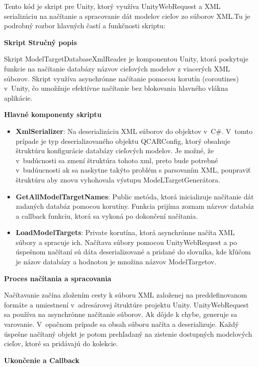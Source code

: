 Tento kód je skript pre Unity, ktorý využíva UnityWebRequest a XML serializáciu na načítanie a spracovanie dát modelov cieľov zo súborov XML.Tu je podrobný rozbor hlavných častí a funkčnosti skriptu:

{\normalsize\textbf{Skript Stručný popis}}

Skript ModelTargetDatabaseXmlReader je komponentou Unity, ktorá poskytuje funkcie na načítanie databázy názvov cieľových modelov z viacerých XML súborov. Skript využíva asynchrónne načítanie pomocou korutín (coroutines) v~Unity, čo umožňuje efektívne načítanie bez blokovania hlavného vlákna aplikácie.

{\normalsize\textbf{Hlavné komponenty skriptu}}

\begin{itemize}
    \item {\small\textbf{XmlSerializer}}: Na deserializáciu XML súborov do objektov v~C\#. V~tomto prípade je typ deserializovaného objektu QCARConfig, ktorý obsahuje štruktúru konfigurácie databázy cieľových modelov. Je možné, že v~budúcnosti sa zmení štruktúra tohoto xml, preto bude potrebné v~budúucnosti ak sa naskytne takýto problém s parsovaním XML, poupraviť štruktúru aby znovu vyhohovala výstupu ModeLTargetGenerátora.
    \item {\small\textbf{GetAllModelTargetNames}}: Public metóda, ktorá inicializuje načítanie dát zadaných databáz pomocou korutíny. Funkcia prijíma zoznam názvov databáz a callback funkciu, ktorá sa vykoná po dokončení načítania.
    \item {\small\textbf{LoadModelTargets}}: Private korutína, ktorá asynchrónne načíta XML súbory a spracuje ich. Načítava súbory pomocou UnityWebRequest a po úspešnom načítaní sú dáta deserializované a pridané do slovníka, kde kľúčom je názov databázy a hodnotou je množina názvov ModelTargetov.
\end{itemize}

{\normalsize\textbf{Proces načítania a spracovania}}

Načítavanie začína zložením cesty k súboru XML založenej na preddefinovanom formáte a umiestnení v~adresárovej štruktúre projektu Unity. UnityWebRequest sa používa na asynchrónne načítanie súborov. Ak dôjde k chybe, generuje sa varovanie. V~opačnom prípade sa obsah súboru načíta a deserializuje. Každý úspešne načítaný objekt je potom prehľadaný na zistenie dostupných modelových cieľov, ktoré sa pridávajú do kolekcie.

{\normalsize\textbf{Ukončenie a Callback}}

